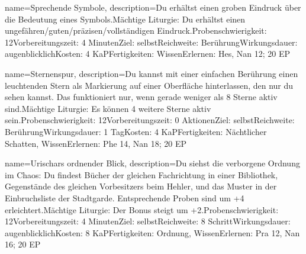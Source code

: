 {
    name={Sprechende Symbole},
    description={Du erhältst einen groben Eindruck über die Bedeutung eines Symbols.\newline Mächtige Liturgie: Du erhältst einen ungefähren/guten/präzisen/vollständigen Eindruck.\newline Probenschwierigkeit: 12\newline Vorbereitungszeit: 4 Minuten\newline Ziel: selbst\newline Reichweite: Berührung\newline Wirkungsdauer: augenblicklich\newline Kosten: 4 KaP\newline Fertigkeiten: Wissen\newline Erlernen: Hes, Nan 12; 20 EP}
}


{
    name={Sternenspur},
    description={Du kannst mit einer einfachen Berührung einen leuchtenden Stern als Markierung auf einer Oberfläche hinterlassen, den nur du sehen kannst. Das funktioniert nur, wenn gerade weniger als 8 Sterne aktiv sind.\newline Mächtige Liturgie: Es können 4 weitere Sterne aktiv sein.\newline Probenschwierigkeit: 12\newline Vorbereitungszeit: 0 Aktionen\newline Ziel: selbst\newline Reichweite: Berührung\newline Wirkungsdauer: 1 Tag\newline Kosten: 4 KaP\newline Fertigkeiten: Nächtlicher Schatten, Wissen\newline Erlernen: Phe 14, Nan 18; 20 EP}
}


{
    name={Urischars ordnender Blick},
    description={Du siehst die verborgene Ordnung im Chaos: Du findest Bücher der gleichen Fachrichtung in einer Bibliothek, Gegenstände des gleichen Vorbesitzers beim Hehler, und das Muster in der Einbruchsliste der Stadtgarde. Entsprechende Proben sind um +4 erleichtert.\newline Mächtige Liturgie: Der Bonus steigt um +2.\newline Probenschwierigkeit: 12\newline Vorbereitungszeit: 4 Minuten\newline Ziel: selbst\newline Reichweite: 8 Schritt\newline Wirkungsdauer: augenblicklich\newline Kosten: 8 KaP\newline Fertigkeiten: Ordnung, Wissen\newline Erlernen: Pra 12, Nan 16; 20 EP}
}


